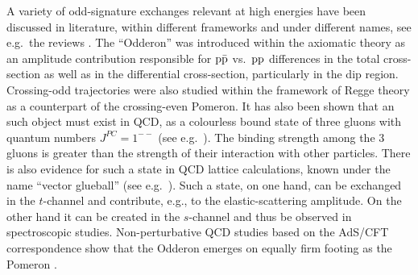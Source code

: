 A variety of odd-signature exchanges relevant at high energies have been discussed in literature, within different frameworks and under different names, see e.g.~the reviews \cite{braun,ewerz}. The ``Odderon'' was introduced within the axiomatic theory \cite{nicolescu-1973,nicolescu-1992,nicolescu-2007} as an amplitude contribution responsible for $\rm p\bar p$ vs.~$\rm pp$ differences in the total cross-section as well as in the differential cross-section, particularly in the dip region. Crossing-odd trajectories were also studied within the framework of Regge theory as a counterpart of the crossing-even Pomeron. It has also been shown that an such object must exist in QCD, as a colourless bound state of three gluons with quantum numbers $J^{PC} = 1^{--}$ (see e.g.~\cite{bartels-2000}). The binding strength among the 3 gluons is greater than the strength of their interaction with other particles. There is also evidence for such a state in QCD lattice calculations, known under the name ``vector glueball'' (see e.g.~\cite{morningstar-1999}). Such a state, on one hand, can be exchanged in the $t$-channel and contribute, e.g., to the elastic-scattering amplitude. On the other hand it can be created in the $s$-channel and thus be observed in spectroscopic studies. Non-perturbative QCD studies based on the AdS/CFT correspondence show that the Odderon emerges on equally firm footing as the Pomeron \cite{brower-2009}.

